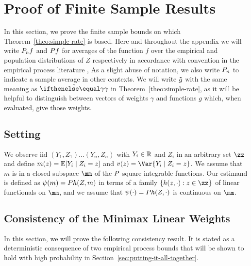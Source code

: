 \section{Proof of Finite Sample Results}
\label{sec:finite-sample-proofs}
In this section, we prove the finite sample bounds on which Theorem~\ref{theo:simple-rate} is based.
Here and throughout the appendix we will write $\Pn f$ and $\P f$ for averages of the function $f$ over the empirical and population distributions of $Z$ respectively in accordance with convention in the empirical process literature \citep[see e.g.][]{vandervaart-wellner1996:weak-convergence},
As a slight abuse of notation, we also write $\Pn$ to indicate a sample average in other contexts. We will write $\tilde{g}$
with the same meaning as $\tilde\riesz$ in Theorem~\ref{theo:simple-rate}, as it will be helpful to distinguish between vectors of weights $\gamma$
and functions $g$ which, when evaluated, give those weights.

\subsection{Setting}
\label{sec:appendix-setting}
We observe iid $(Y_1,Z_1) \ldots (Y_n,Z_n)$ with $Y_i \in \mathbb{R}$ and $Z_i$ in an arbitrary set $\zz$
and define $m(z) = \E[Y_i \mid Z_i=z]$ and $v(z) = \Var{Y_i \mid Z_i=z}$. We assume that $m$ is in a closed subspace $\mm$ 
of the $\P$-square integrable functions. Our estimand is defined as $\psi(m) = \P h(Z,m)$ in terms of a family $\set{h(z,\cdot) : z \in \zz}$ of linear functionals on $\mm$, and we assume that $\psi(\cdot) = \P h(Z,\cdot)$ is continuous on $\mm$.


\subsection{Consistency of the Minimax Linear Weights}
\label{sec:consistency}

In this section, we will prove the following consistency result.
It is stated as a deterministic consequence of two empirical process bounds
that will be shown to hold with high probability in Section~\ref{sec:putting-it-all-together}.

